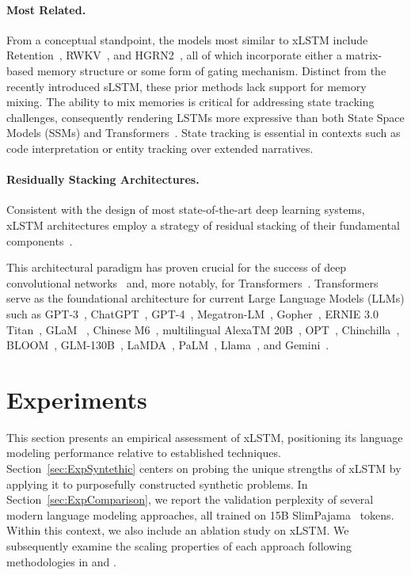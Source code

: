 \paragraph{Most Related.} From a conceptual standpoint, the models most similar to xLSTM include Retention~\citep{Sun:23arxiv}, RWKV~\citep{Peng:23arxivshort,Peng:24arxivshort}, and HGRN2~\citep{Qin:24arxiv}, all of which incorporate either a matrix-based memory structure or some form of gating mechanism. Distinct from the recently introduced sLSTM, these prior methods lack support for memory mixing. The ability to mix memories is critical for addressing state tracking challenges, consequently rendering LSTMs more expressive than both State Space Models (SSMs) and Transformers~\citep{Merrill:24,Deletang:23}. State tracking is essential in contexts such as code interpretation or entity tracking over extended narratives.

\paragraph{Residually Stacking Architectures.} Consistent with the design of most state-of-the-art deep learning systems, xLSTM architectures employ a strategy of residual stacking of their fundamental components~\citep{Srivastava:15,He:16}.

This architectural paradigm has proven crucial for the success of deep convolutional networks~\citep{He:16} and, more notably, for Transformers~\citep{Vaswani:17}. Transformers serve as the foundational architecture for current Large Language Models (LLMs) such as GPT-3~\citep{Brown:20short}, ChatGPT~\citep{Schulman:22short}, GPT-4~\citep{Achiam:23gpt4short}, Megatron-LM~\citep{Shoeybi:19}, Gopher~\citep{Rae:21short}, ERNIE 3.0 Titan~\citep{Wang:21arxivshort}, GLaM ~\citep{Du:21glamshort}, Chinese M6~\citep{Lin:21}, multilingual AlexaTM 20B~\citep{Soltan:22}, OPT~\citep{Zhang:22opt}, Chinchilla~\citep{Hoffmann:22short}, BLOOM~\citep{Scao:22arxivshort}, GLM-130B~\citep{Zeng:22arxivshort}, LaMDA~\citep{Thoppilan:22short}, PaLM~\citep{Chowdhery:22short}, Llama~\citep{Touvron:23arxiv}, and Gemini~\citep{GeminiTeam:23arxiv,Reid:24arxiv}.

\section{Experiments}
\label{sec:Exp}

This section presents an empirical assessment of xLSTM, positioning its language modeling performance relative to established techniques. Section~\ref{sec:ExpSyntethic} centers on probing the unique strengths of xLSTM by applying it to purposefully constructed synthetic problems. In Section~\ref{sec:ExpComparison}, we report the validation perplexity of several modern language modeling approaches, all trained on 15B SlimPajama~\citep{Soboleva:23} tokens. Within this context, we also include an ablation study on xLSTM. We subsequently examine the scaling properties of each approach following methodologies in \citet{Kaplan:20} and \citet{Brown:20short}. 

